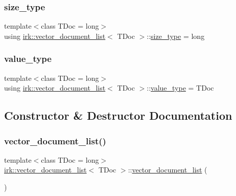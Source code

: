 \subsubsection{\texorpdfstring{size\+\_\+type}{size\_type}}
{\footnotesize\ttfamily template$<$class T\+Doc  = long$>$ \\
using \mbox{\hyperlink{classirk_1_1vector__document__list}{irk\+::vector\+\_\+document\+\_\+list}}$<$ T\+Doc $>$\+::\mbox{\hyperlink{classirk_1_1vector__document__list_ac9387bd9f5dc89b638b6295858a9268c}{size\+\_\+type}} =  long}

\mbox{\label{classirk_1_1vector__document__list_a0ec9c56f5e12a3a9101b5a18b2fbe69f}} 
\subsubsection{\texorpdfstring{value\+\_\+type}{value\_type}}
{\footnotesize\ttfamily template$<$class T\+Doc  = long$>$ \\
using \mbox{\hyperlink{classirk_1_1vector__document__list}{irk\+::vector\+\_\+document\+\_\+list}}$<$ T\+Doc $>$\+::\mbox{\hyperlink{classirk_1_1vector__document__list_a0ec9c56f5e12a3a9101b5a18b2fbe69f}{value\+\_\+type}} =  T\+Doc}



\subsection{Constructor \& Destructor Documentation}
\mbox{\label{classirk_1_1vector__document__list_a765120ad7cc8fe813666aa223c7055f0}} 
\subsubsection{\texorpdfstring{vector\+\_\+document\+\_\+list()}{vector\_document\_list()}\hspace{0.1cm}{\footnotesize\ttfamily [1/4]}}
{\footnotesize\ttfamily template$<$class T\+Doc  = long$>$ \\
\mbox{\hyperlink{classirk_1_1vector__document__list}{irk\+::vector\+\_\+document\+\_\+list}}$<$ T\+Doc $>$\+::\mbox{\hyperlink{classirk_1_1vector__document__list}{vector\+\_\+document\+\_\+list}} (\begin{DoxyParamCaption}{ }\end{DoxyParamCaption})\hspace{0.3cm}{\ttfamily [default]}}

